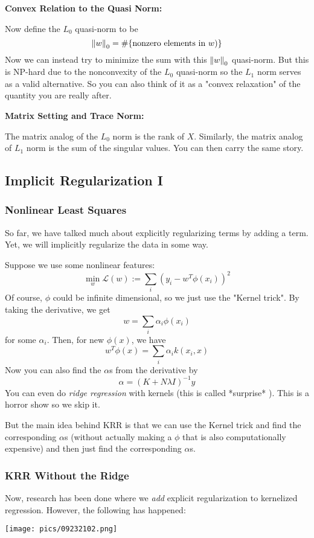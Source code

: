\documentclass[11pt]{scrartcl}
\begin{document}
\textbf{Convex Relation to the Quasi Norm:}

Now define the $L_0$ quasi-norm to be 
$$\left\lVert w\right\rVert_0=\#\{\text{nonzero elements in }w)\}$$
Now we can instead try to minimize the sum with this $\left\lVert w\right\rVert_0$ quasi-norm. But this is NP-hard due to the nonconvexity of the $L_0$ quasi-norm so the $L_1$ norm serves as a valid alternative. So you can also think of it as a "convex relaxation" of the quantity you are really after. 

\textbf{Matrix Setting and Trace Norm:}

The matrix analog of the $L_0$ norm is the rank of $X$. Similarly, the matrix analog of $L_1$ norm is the sum of the singular values. You can then carry the same story. 

\subsection{Implicit Regularization I}
\subsubsection{Nonlinear Least Squares}
So far, we have talked much about explicitly regularizing terms by adding a term. Yet, we will implicitly regularize the data in some way. 

Suppose we use some nonlinear features:
$$\min_{w}\mathcal{L}(w) := \sum_{i}(y_i-w^{T}\phi(x_i))^2$$
Of course, $\phi$ could be infinite dimensional, so we just use the "Kernel trick". By taking the derivative, we get $$w=\sum_{i}\alpha_{i}\phi(x_i)$$ for some $\alpha_i$. Then, for new $\phi(x)$, we have $$w^{T}\phi(x)=\sum_{i}\alpha_ik(x_i,x)$$
Now you can also find the $\alpha$s from the derivative by $$\alpha=(K+N\lambda{I})^{-1}y$$
You can even do \textit{ridge regression} with kernels (this is called *surprise* ). This is a horror show so we skip it.

But the main idea behind KRR is that we can use the Kernel trick and find the corresponding $\alpha$s (without actually making a $\phi$ that is also computationally expensive) and then just find the corresponding $\alpha$s. 

\subsubsection{KRR Without the Ridge}

Now, research has been done where we \textit{add} explicit regularization to kernelized regression. However, the following has happened: 
\begin{center}
    \texttt{[image: pics/09232102.png]}
\end{center}
\end{document}
